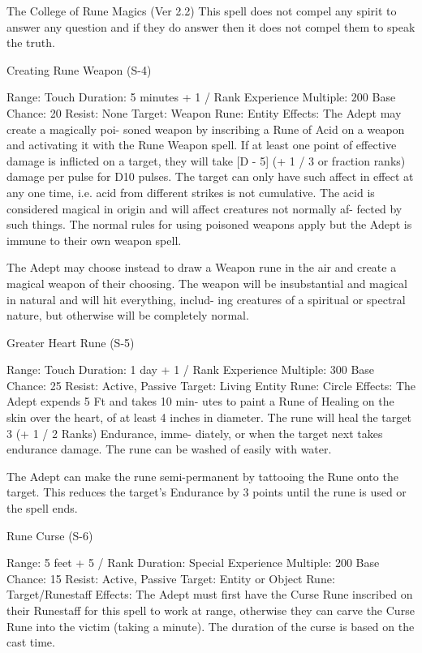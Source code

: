 \begin{Chapter}{The College of Rune Magics (Ver 2.2)}
This spell does not compel any spirit to answer any 
question  and  if  they  do  answer  then  it  does  not 
compel them to speak the truth. 

Creating Rune Weapon (S-4) 

Range: Touch 
Duration: 5 minutes + 1 / Rank 
Experience Multiple: 200 
Base Chance: 20%
Resist: None 
Target: Weapon  
Rune: Entity 
Effects:  The  Adept  may  create  a  magically  poi-
soned  weapon  by  inscribing  a  Rune  of  Acid  on  a 
weapon  and  activating  it  with  the  Rune  Weapon 
spell.  If  at  least  one  point  of  effective  damage  is 
inflicted on a target, they will take [D - 5] (+ 1 / 3 
or fraction ranks) damage per pulse for D10 pulses. 
The  target  can  only  have  such  affect  in  effect  at 
any one time, i.e. acid from different strikes is not 
cumulative.  The  acid  is  considered  magical  in 
origin  and  will  affect  creatures  not  normally  af-
fected  by  such  things.  The  normal  rules  for  using 
poisoned  weapons  apply  but  the  Adept  is  immune 
to their own weapon spell. 

The  Adept  may  choose  instead  to  draw  a  Weapon 
rune in the air and create a magical weapon of their 
choosing.  The  weapon  will  be  insubstantial  and 
magical  in  natural  and  will  hit  everything,  includ-
ing  creatures  of  a  spiritual  or  spectral  nature,  but 
otherwise will be completely normal. 

Greater Heart Rune (S-5) 

Range: Touch 
Duration: 1 day + 1 / Rank 
Experience Multiple: 300 
Base Chance: 25%
Resist: Active, Passive 
Target: Living Entity  
Rune: Circle 
Effects: The Adept expends 5 Ft and takes 10 min-
utes to paint a Rune of Healing on the skin over the 
heart, of at least 4 inches in diameter. The rune will 
heal the target 3 (+ 1 / 2 Ranks) Endurance, imme-
diately,  or  when  the  target  next  takes  endurance 
damage.  The  rune  can  be  washed  of  easily  with 
water. 

The  Adept  can  make  the  rune  semi-permanent  by 
tattooing the Rune onto the target. This reduces the 
target’s  Endurance  by  3  points  until  the  rune  is 
used or the spell ends. 

Rune Curse (S-6) 

Range: 5 feet + 5 / Rank 
Duration: Special 
Experience Multiple: 200 
Base Chance: 15%
Resist: Active, Passive 
Target: Entity or Object  
Rune: Target/Runestaff 
Effects: The Adept must first have the Curse Rune 
inscribed  on  their  Runestaff  for  this  spell  to  work 
at range, otherwise they can carve the Curse Rune 
into  the  victim  (taking  a  minute).  The  duration  of 
the curse is based on the cast time. 


\end{Chapter}
